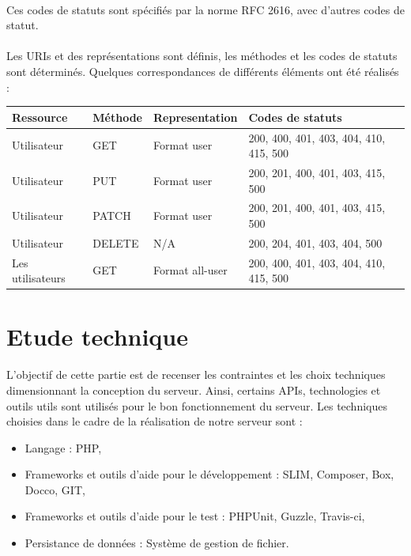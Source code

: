 \documentclass{report}
\begin{document}
\paragraph{}
Ces codes de statuts sont spécifiés par la norme RFC 2616, avec d'autres codes de statut.

\paragraph{}
Les URIs et des représentations sont définis, les méthodes et les codes de statuts sont déterminés. Quelques 
correspondances de différents éléments ont été réalisés : \\

\begin{tabular}{|p{3cm}|p{2cm}|p{3cm}|p{6cm}|}
\hline \bf Ressource & \bf Méthode & \bf Representation & \bf Codes de statuts \\
\hline Utilisateur & GET & Format user & 200, 400, 401, 403, 404, 410, 415, 500 \\
\hline Utilisateur & PUT & Format user & 200, 201, 400, 401, 403, 415, 500 \\
\hline Utilisateur & PATCH & Format user & 200, 201, 400, 401, 403, 415, 500 \\
\hline Utilisateur & DELETE & N/A & 200, 204, 401, 403, 404, 500 \\
\hline Les utilisateurs & GET & Format all-user & 200, 400, 401, 403, 404, 410, 415, 500 \\
\hline
\end{tabular}

\section{Etude technique}

\paragraph{}
L'objectif de cette partie est de recenser les contraintes et les choix techniques dimensionnant la conception du serveur.
Ainsi, certains APIs, technologies et outils utils sont utilisés pour le bon fonctionnement du serveur. Les techniques 
choisies dans le cadre de la réalisation de notre serveur sont :

\begin{itemize}
\item Langage : PHP,
\item Frameworks et outils d'aide pour le développement : SLIM, Composer, Box, Docco, GIT,
\item Frameworks et outils d'aide pour le test : PHPUnit, Guzzle, Travis-ci,
\item Persistance de données : Système de gestion de fichier.
\end{itemize}
\end{document}
